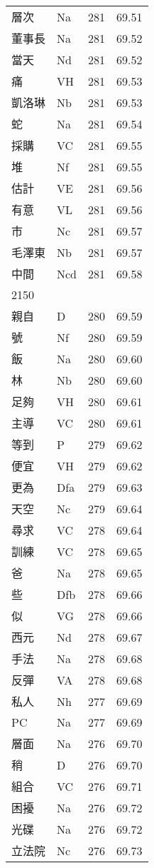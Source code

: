 \documentclass[twocolumn]{book}
\begin{document}
\begin{supertabular}{llrr}
層次 & Na & 281 &  69.51\\
董事長 & Na & 281 &  69.52\\
當天 & Nd & 281 &  69.52\\
痛 & VH & 281 &  69.53\\
凱洛琳 & Nb & 281 &  69.53\\
蛇 & Na & 281 &  69.54\\
採購 & VC & 281 &  69.55\\
堆 & Nf & 281 &  69.55\\
估計 & VE & 281 &  69.56\\
有意 & VL & 281 &  69.56\\
市 & Nc & 281 &  69.57\\
毛澤東 & Nb & 281 &  69.57\\
中間 & Ncd & 281 &  69.58\\
2150\\
親自 & D & 280 &  69.59\\
號 & Nf & 280 &  69.59\\
飯 & Na & 280 &  69.60\\
林 & Nb & 280 &  69.60\\
足夠 & VH & 280 &  69.61\\
主導 & VC & 280 &  69.61\\
等到 & P & 279 &  69.62\\
便宜 & VH & 279 &  69.62\\
更為 & Dfa & 279 &  69.63\\
天空 & Nc & 279 &  69.64\\
尋求 & VC & 278 &  69.64\\
訓練 & VC & 278 &  69.65\\
爸 & Na & 278 &  69.65\\
些 & Dfb & 278 &  69.66\\
似 & VG & 278 &  69.66\\
西元 & Nd & 278 &  69.67\\
手法 & Na & 278 &  69.68\\
反彈 & VA & 278 &  69.68\\
私人 & Nh & 277 &  69.69\\
PC & Na & 277 &  69.69\\
層面 & Na & 276 &  69.70\\
稍 & D & 276 &  69.70\\
組合 & VC & 276 &  69.71\\
困擾 & Na & 276 &  69.72\\
光碟 & Na & 276 &  69.72\\
立法院 & Nc & 276 &  69.73\\

\end{supertabular}
\end{document}
